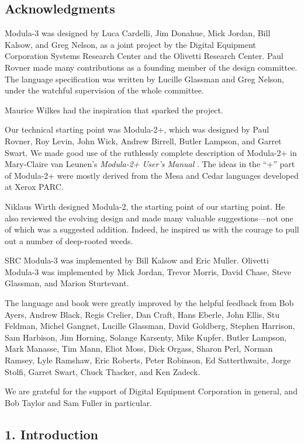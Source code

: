 \documentclass[10pt]{article}
\begin{document}
\subsection*{Acknowledgments}

Modula-3 was designed by Luca Cardelli, Jim Donahue, Mick Jordan, Bill Kalsow,
and Greg Nelson, as a joint project by the Digital Equipment Corporation
Systems Research Center and the Olivetti Research Center. Paul Rovner made
many contributions as a founding member of the design committee. The language
specification was written by Lucille Glassman and Greg Nelson, under the
watchful supervision of the whole committee.

Maurice Wilkes had the inspiration that sparked the project.

Our technical starting point was Modula-2+, which was designed by Paul Rovner,
Roy Levin, John Wick, Andrew Birrell, Butler Lampson, and Garret Swart. We
made good use of the ruthlessly complete description of Modula-2+ in
Mary-Claire van Leunen's \emph{Modula-2+ User's Manual} . The ideas in the
``+'' part of Modula-2+ were mostly derived from the Mesa and Cedar languages
developed at Xerox PARC.

Niklaus Wirth designed Modula-2, the starting point of our starting point. He
also reviewed the evolving design and made many valuable suggestions---not one
of which was a suggested addition. Indeed, he inspired us with the courage to
pull out a number of deep-rooted weeds.

SRC Modula-3 was implemented by Bill Kalsow and Eric Muller. Olivetti Modula-3
was implemented by Mick Jordan, Trevor Morris, David Chase, Steve Glassman,
and Marion Sturtevant.

The language and book were greatly improved by the helpful feedback from Bob
Ayers, Andrew Black, Regis Crelier, Dan Craft, Hans Eberle, John Ellis, Stu
Feldman, Michel Gangnet, Lucille Glassman, David Goldberg, Stephen Harrison,
Sam Harbison, Jim Horning, Solange Karsenty, Mike Kupfer, Butler Lampson, Mark
Manasse, Tim Mann, Eliot Moss, Dick Orgass, Sharon Perl, Norman Ramsey, Lyle
Ramshaw, Eric Roberts, Peter Robinson, Ed Satterthwaite, Jorge Stolfi, Garret
Swart, Chuck Thacker, and Ken Zadeck.

We are grateful for the support of Digital Equipment Corporation in general,
and Bob Taylor and Sam Fuller in particular.

\subsection*{1. Introduction}
\end{document}

